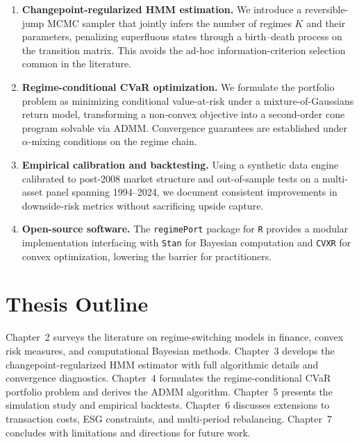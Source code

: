 \documentclass[12pt,oneside]{book}
\begin{document}
\begin{enumerate}[leftmargin=*,itemsep=4pt]
  \item \textbf{Changepoint-regularized HMM estimation.} We introduce a reversible-jump MCMC sampler that jointly infers the number of regimes $K$ and their parameters, penalizing superfluous states through a birth--death process on the transition matrix. This avoids the ad-hoc information-criterion selection common in the literature.

  \item \textbf{Regime-conditional CVaR optimization.} We formulate the portfolio problem as minimizing conditional value-at-risk under a mixture-of-Gaussians return model, transforming a non-convex objective into a second-order cone program solvable via ADMM. Convergence guarantees are established under $\alpha$-mixing conditions on the regime chain.

  \item \textbf{Empirical calibration and backtesting.} Using a synthetic data engine calibrated to post-2008 market structure and out-of-sample tests on a multi-asset panel spanning 1994--2024, we document consistent improvements in downside-risk metrics without sacrificing upside capture.

  \item \textbf{Open-source software.} The \texttt{regimePort} package for \texttt{R} provides a modular implementation interfacing with \texttt{Stan} for Bayesian computation and \texttt{CVXR} for convex optimization, lowering the barrier for practitioners.

\end{enumerate}

\section{Thesis Outline}

Chapter~2 surveys the literature on regime-switching models in finance, convex risk measures, and computational Bayesian methods. Chapter~3 develops the changepoint-regularized HMM estimator with full algorithmic details and convergence diagnostics. Chapter~4 formulates the regime-conditional CVaR portfolio problem and derives the ADMM algorithm. Chapter~5 presents the simulation study and empirical backtests. Chapter~6 discusses extensions to transaction costs, ESG constraints, and multi-period rebalancing. Chapter~7 concludes with limitations and directions for future work.

\end{document}

